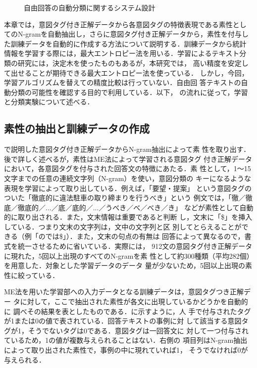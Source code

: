 \begin{figure}[t]
\begin{center}
\leavevmode
{}
\caption{自由回答の自動分類に関するシステム設計}
\label{fig:figure3}
\end{center}
\end{figure}

本章では，意図タグ付き正解データから各意図タグの特徴表現である素性とし
てのN-gramを自動抽出し，さらに意図タグ付き正解データから，素性を付与し
た訓練データを自動的に作成する方法について説明する．訓練データから統計
情報を学習する際には，最大エントロピー法を用いる．学習によるテキスト分
類の研究には，決定木を使ったものもあるが\cite{nakano:98}，本研究では，
高い精度を安定して出せることが期待できる最大エントロピー法を使っている．
しかし，今回，学習アルゴリズムを替えての精度比較は行っていない．自由回
答テキストの自動分類の可能性を確認する目的で利用している．以下，
の流れに従って，学習と分類実験について述べる．

\subsection{素性の抽出と訓練データの作成}
\label{ssec:data_preparation}

で説明した意図タグ付き正解データからN-gram抽出によって素
性を取り出す．後で詳しく述べるが，素性はME法によって学習される意図タグ
付き正解データにおいて，各意図タグを付与された回答文の特徴にあたる．素
性として，1〜15文字までの任意の連続文字列（N-gram）を使い，意図分類の
キーになるような表現を学習によって取り出している．例えば，「要望・提案」
という意図タグのついた「徹底的に違法駐車の取り締まりを行うべき」という
例文では，「徹／徹底／徹底的／...／底／底的／...／うべき／べ／べき／き」
などが素性として自動的に取り出される．また，文末情報は重要であると判断
し，文末に「\$」を挿入している．つまり文末の文字列は，文中の文字列と区
別してとらえることができる（例「のでは\$」）．また，文末の句点の有無は
回答によって異なるので，書式を統一させるために省いている．実際には，
912文の意図タグ付き正解データに現れた，5回以上出現のすべてのN-gramを素
性として約300種類（平均282個）を用意した．対象とした学習データのデータ
量が少ないため，5回以上出現の素性に絞っている．

ME法を用いた学習部への入力データとなる訓練データは，意図タグつき正解デー
タに対して，ここで抽出された素性が各文に出現しているかどうかを自動的に
調べその結果を表としたものである．に示すように，人
手で付与されたタグが1または0の値で表されている．回答テキストの事例に対
して該当する意図タグが1，そうでないタグは0である．意図タグは一回答文に
対して一つ付与されているため，1の値が複数与えられることはない．右側の
項目列はN-gram抽出によって取り出された素性で，事例の中に現れていれば1，
そうでなければ0が与えられる．


